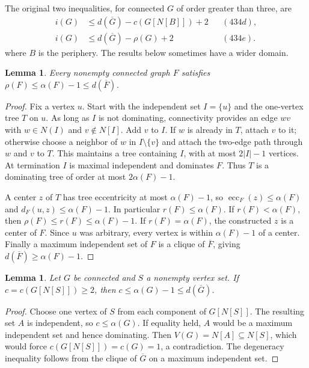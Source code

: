 \documentclass[11pt,a4paper]{article}
\newtheorem{lemma}[theorem]{Lemma}
\theoremstyle{remark}
\begin{document}
The original two inequalities, for connected $G$ of order greater
than three, are
\[
 \begin{aligned}
 i(G)&\le d(\overline G)-c(G[N[B]])+2 &&(434d),\\
 i(G)&\le d(\overline G)-\rho(G)+2 &&(434e).
 \end{aligned}
\]
where $B$ is the periphery. The results below sometimes have a wider domain.

\begin{lemma}\label{r8id:centeralpha}
Every nonempty connected graph $F$ satisfies
$\rho(F)\le\alpha(F)-1\le d(\overline F)$.
\end{lemma}
\begin{proof}
Fix a vertex $u$. Start with the independent set $I=\{u\}$ and the
one-vertex tree $T$ on $u$. As long as $I$ is not dominating, connectivity
provides an edge $wv$ with $w\in N(I)$ and $v\notin N[I]$.
Add $v$ to $I$. If $w$ is already in $T$, attach $v$ to it; otherwise
choose a neighbor of $w$ in $I\setminus\{v\}$ and attach the two-edge
path through $w$ and $v$ to $T$. This maintains a tree containing $I$,
with at most $2|I|-1$ vertices. At termination $I$ is maximal independent
and dominates $F$. Thus $T$ is a dominating tree of order at most
$2\alpha(F)-1$.

A center $z$ of $T$ has tree eccentricity at most $\alpha(F)-1$,
so $\operatorname{ecc}_F(z)\le\alpha(F)$ and
$d_F(u,z)\le\alpha(F)-1$. In particular $r(F)\le\alpha(F)$.
If $r(F)<\alpha(F)$, then $\rho(F)\le r(F)\le\alpha(F)-1$.
If $r(F)=\alpha(F)$, the constructed $z$ is a center of $F$.
Since $u$ was arbitrary, every vertex is within $\alpha(F)-1$ of a
center. Finally a maximum independent set of $F$ is a clique of
$\overline F$, giving $d(\overline F)\ge\alpha(F)-1$.
\end{proof}

\begin{lemma}\label{r8id:componentsalpha}
Let $G$ be connected and $S$ a nonempty vertex set. If
$c=c(G[N[S]])\ge2$, then $c\le\alpha(G)-1\le d(\overline G)$.
\end{lemma}
\begin{proof}
Choose one vertex of $S$ from each component of $G[N[S]]$.
The resulting set $A$ is independent, so $c\le\alpha(G)$.
If equality held, $A$ would be a maximum independent set and hence
dominating. Then $V(G)=N[A]\subseteq N[S]$, which would force
$c(G[N[S]])=c(G)=1$, a contradiction. The degeneracy inequality
follows from the clique of $\overline G$ on a maximum independent set.
\end{proof}
\end{document}
